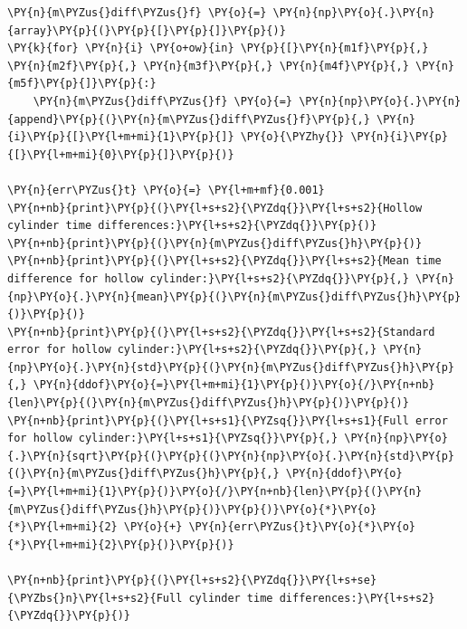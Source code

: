 \begin{tcolorbox}[breakable, size=fbox, boxrule=1pt, pad at break*=1mm,colback=cellbackground, colframe=cellborder]
\begin{Verbatim}[commandchars=\\\{\}]
\PY{n}{m\PYZus{}diff\PYZus{}f} \PY{o}{=} \PY{n}{np}\PY{o}{.}\PY{n}{array}\PY{p}{(}\PY{p}{[}\PY{p}{]}\PY{p}{)}
\PY{k}{for} \PY{n}{i} \PY{o+ow}{in} \PY{p}{[}\PY{n}{m1f}\PY{p}{,} \PY{n}{m2f}\PY{p}{,} \PY{n}{m3f}\PY{p}{,} \PY{n}{m4f}\PY{p}{,} \PY{n}{m5f}\PY{p}{]}\PY{p}{:}
    \PY{n}{m\PYZus{}diff\PYZus{}f} \PY{o}{=} \PY{n}{np}\PY{o}{.}\PY{n}{append}\PY{p}{(}\PY{n}{m\PYZus{}diff\PYZus{}f}\PY{p}{,} \PY{n}{i}\PY{p}{[}\PY{l+m+mi}{1}\PY{p}{]} \PY{o}{\PYZhy{}} \PY{n}{i}\PY{p}{[}\PY{l+m+mi}{0}\PY{p}{]}\PY{p}{)}

\PY{n}{err\PYZus{}t} \PY{o}{=} \PY{l+m+mf}{0.001}
\PY{n+nb}{print}\PY{p}{(}\PY{l+s+s2}{\PYZdq{}}\PY{l+s+s2}{Hollow cylinder time differences:}\PY{l+s+s2}{\PYZdq{}}\PY{p}{)}
\PY{n+nb}{print}\PY{p}{(}\PY{n}{m\PYZus{}diff\PYZus{}h}\PY{p}{)}
\PY{n+nb}{print}\PY{p}{(}\PY{l+s+s2}{\PYZdq{}}\PY{l+s+s2}{Mean time difference for hollow cylinder:}\PY{l+s+s2}{\PYZdq{}}\PY{p}{,} \PY{n}{np}\PY{o}{.}\PY{n}{mean}\PY{p}{(}\PY{n}{m\PYZus{}diff\PYZus{}h}\PY{p}{)}\PY{p}{)}
\PY{n+nb}{print}\PY{p}{(}\PY{l+s+s2}{\PYZdq{}}\PY{l+s+s2}{Standard error for hollow cylinder:}\PY{l+s+s2}{\PYZdq{}}\PY{p}{,} \PY{n}{np}\PY{o}{.}\PY{n}{std}\PY{p}{(}\PY{n}{m\PYZus{}diff\PYZus{}h}\PY{p}{,} \PY{n}{ddof}\PY{o}{=}\PY{l+m+mi}{1}\PY{p}{)}\PY{o}{/}\PY{n+nb}{len}\PY{p}{(}\PY{n}{m\PYZus{}diff\PYZus{}h}\PY{p}{)}\PY{p}{)}
\PY{n+nb}{print}\PY{p}{(}\PY{l+s+s1}{\PYZsq{}}\PY{l+s+s1}{Full error for hollow cylinder:}\PY{l+s+s1}{\PYZsq{}}\PY{p}{,} \PY{n}{np}\PY{o}{.}\PY{n}{sqrt}\PY{p}{(}\PY{p}{(}\PY{n}{np}\PY{o}{.}\PY{n}{std}\PY{p}{(}\PY{n}{m\PYZus{}diff\PYZus{}h}\PY{p}{,} \PY{n}{ddof}\PY{o}{=}\PY{l+m+mi}{1}\PY{p}{)}\PY{o}{/}\PY{n+nb}{len}\PY{p}{(}\PY{n}{m\PYZus{}diff\PYZus{}h}\PY{p}{)}\PY{p}{)}\PY{o}{*}\PY{o}{*}\PY{l+m+mi}{2} \PY{o}{+} \PY{n}{err\PYZus{}t}\PY{o}{*}\PY{o}{*}\PY{l+m+mi}{2}\PY{p}{)}\PY{p}{)}

\PY{n+nb}{print}\PY{p}{(}\PY{l+s+s2}{\PYZdq{}}\PY{l+s+se}{\PYZbs{}n}\PY{l+s+s2}{Full cylinder time differences:}\PY{l+s+s2}{\PYZdq{}}\PY{p}{)}


\end{Verbatim}
\end{tcolorbox}
